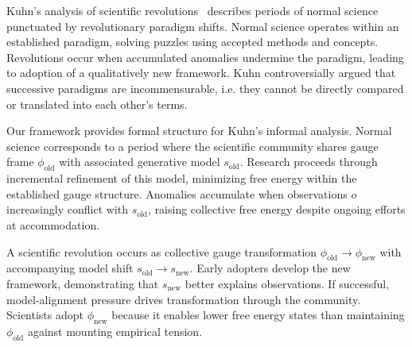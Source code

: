 \documentclass[11pt]{article}
\begin{document}
Kuhn's analysis of scientific revolutions~\cite{Kuhn1962} describes periods of normal science punctuated by revolutionary paradigm shifts. Normal science operates within an established paradigm, solving puzzles using accepted methods and concepts. Revolutions occur when accumulated anomalies undermine the paradigm, leading to adoption of a qualitatively new framework. Kuhn controversially argued that successive paradigms are incommensurable, i.e. they cannot be directly compared or translated into each other's terms.

Our framework provides formal structure for Kuhn's informal analysis. Normal science corresponds to a period where the scientific community shares gauge frame $\phi_{\text{old}}$ with associated generative model $s_{\text{old}}$. Research proceeds through incremental refinement of this model, minimizing free energy within the established gauge structure. Anomalies accumulate when observations $o$ increasingly conflict with $s_{\text{old}}$, raising collective free energy despite ongoing efforts at accommodation.

A scientific revolution occurs as collective gauge transformation $\phi_{\text{old}} \to \phi_{\text{new}}$ with accompanying model shift $s_{\text{old}} \to s_{\text{new}}$. Early adopters develop the new framework, demonstrating that $s_{\text{new}}$ better explains observations. If successful, model-alignment pressure drives transformation through the community. Scientists adopt $\phi_{\text{new}}$ because it enables lower free energy states than maintaining $\phi_{\text{old}}$ against mounting empirical tension.
\end{document}

